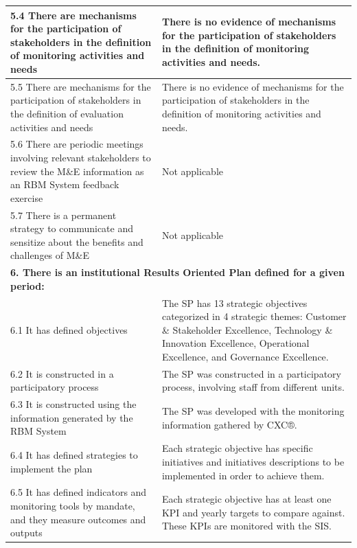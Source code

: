 \documentclass[
  10pt,
]{book}
\begin{document}
\begin{table}
\begin{tabular}[t]{l|l}
\hline
\hspace{1em}5.4 There are mechanisms for the participation of stakeholders in the definition of monitoring activities and needs & There is no evidence of mechanisms for the participation of stakeholders in the definition of monitoring activities and needs.\\
\hline
\hspace{1em}5.5 There are mechanisms for the participation of stakeholders in the definition of evaluation activities and needs & There is no evidence of mechanisms for the participation of stakeholders in the definition of monitoring activities and needs.\\
\hline
\hspace{1em}5.6 There are periodic meetings involving relevant stakeholders to review the M\&E information as an RBM System feedback exercise & Not applicable\\
\hline
\hspace{1em}5.7 There is a permanent strategy to communicate and sensitize about the benefits and challenges of M\&E & Not applicable\\
\hline
\multicolumn{2}{l}{\textbf{6. There is an institutional Results Oriented Plan defined for a given period:}}\\
\hline
\hspace{1em}6.1 It has defined objectives & The SP has 13 strategic objectives categorized in 4 strategic themes: Customer \& Stakeholder Excellence, Technology \& Innovation Excellence, Operational Excellence, and Governance Excellence.\\
\hline
\hspace{1em}6.2 It is constructed in a participatory process & The SP was constructed in a participatory process, involving staff from different units.\\
\hline
\hspace{1em}6.3 It is constructed using the information generated by the RBM System & The SP was developed with the monitoring information gathered by CXC®.\\
\hline
\hspace{1em}6.4 It has defined strategies to implement the plan & Each strategic objective has specific initiatives and initiatives descriptions to be implemented in order to achieve them.\\
\hline
\hspace{1em}6.5 It has defined indicators and monitoring tools by mandate, and they measure outcomes and outputs & Each strategic objective has at least one KPI and yearly targets to compare against. These KPIs are monitored with the SIS.\\

\end{tabular}
\end{table}
\end{document}
